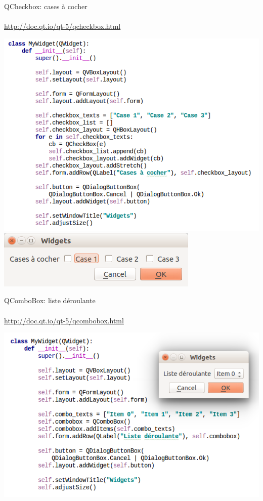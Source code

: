 \documentclass[9pt, french, brown]{beamer}
\newcommand{\mytitle}[1]{{\color{brown}#1 \\~\\}}
\begin{document}
\begin{frame}{\secname}{\subsecname}
\mytitle{QCheckbox: cases à cocher}
\url{http://doc.qt.io/qt-5/qcheckbox.html}
\begin{center}\includegraphics[scale=0.3]{img/widget9_1}\includegraphics[scale=0.3]{img/widget9_1_fig}\end{center}
\end{frame}

\begin{frame}{\secname}{\subsecname}
\mytitle{QComboBox: liste déroulante}
\url{http://doc.qt.io/qt-5/qcombobox.html}
\begin{center}\includegraphics[scale=0.5]{img/widget10_1}\end{center}
\end{frame}
\end{document}

